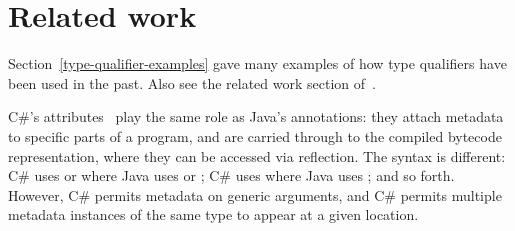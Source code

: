 \documentclass[10pt]{article}
\begin{document}
% 
% 
% 
% 
% 


\section{Related work\label{related-work}}

Section~\ref{type-qualifier-examples} gave many examples of how type
qualifiers have been used in the past.  Also see the related work section
of~\cite{PapiACPE2008}.

C\#'s attributes~\cite[chap.~24]{ECMA334-4th} play the same role as Java's
annotations:  they attach metadata to specific parts of a program, and are
carried through to the compiled bytecode representation, where they can be
accessed via reflection.  The syntax is different:  C\# uses
\code{[AnnotationName]} or  where Java uses
 or
; C\# uses  where
Java uses ; and so forth.
However, C\# permits metadata
on generic arguments, and C\# permits multiple metadata instances of the
same type to appear at a given location.
\end{document}
